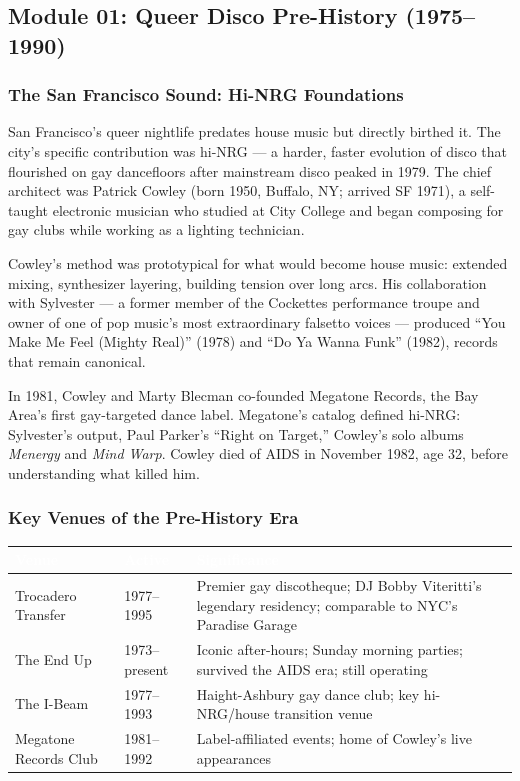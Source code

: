 \documentclass[11pt,letterpaper]{article}
\newcommand{\tableheader}[1]{\textbf{\sffamily\textcolor{white}{#1}}}
\begin{document}
\subsection{Module 01: Queer Disco Pre-History (1975--1990)}

\subsubsection{The San Francisco Sound: Hi-NRG Foundations}

San Francisco's queer nightlife predates house music but directly birthed it. The city's specific contribution was hi-NRG --- a harder, faster evolution of disco that flourished on gay dancefloors after mainstream disco peaked in 1979. The chief architect was Patrick Cowley (born 1950, Buffalo, NY; arrived SF 1971), a self-taught electronic musician who studied at City College and began composing for gay clubs while working as a lighting technician.

Cowley's method was prototypical for what would become house music: extended mixing, synthesizer layering, building tension over long arcs. His collaboration with Sylvester --- a former member of the Cockettes performance troupe and owner of one of pop music's most extraordinary falsetto voices --- produced ``You Make Me Feel (Mighty Real)'' (1978) and ``Do Ya Wanna Funk'' (1982), records that remain canonical.

In 1981, Cowley and Marty Blecman co-founded Megatone Records, the Bay Area's first gay-targeted dance label. Megatone's catalog defined hi-NRG: Sylvester's output, Paul Parker's ``Right on Target,'' Cowley's solo albums \textit{Menergy} and \textit{Mind Warp}. Cowley died of AIDS in November 1982, age 32, before understanding what killed him.

\subsubsection{Key Venues of the Pre-History Era}

\begin{center}
\begin{tabularx}{\textwidth}{L{3.5cm}L{3cm}X}
\toprule
{}
\tableheader{Venue} & \tableheader{Active} & \tableheader{Significance} \\
\midrule
Trocadero Transfer & 1977--1995 & Premier gay discotheque; DJ Bobby Viteritti's legendary residency; comparable to NYC's Paradise Garage \\
The End Up & 1973--present & Iconic after-hours; Sunday morning parties; survived the AIDS era; still operating \\
The I-Beam & 1977--1993 & Haight-Ashbury gay dance club; key hi-NRG/house transition venue \\
Megatone Records Club & 1981--1992 & Label-affiliated events; home of Cowley's live appearances \\
\bottomrule
\end{tabularx}
\end{center}
\end{document}
